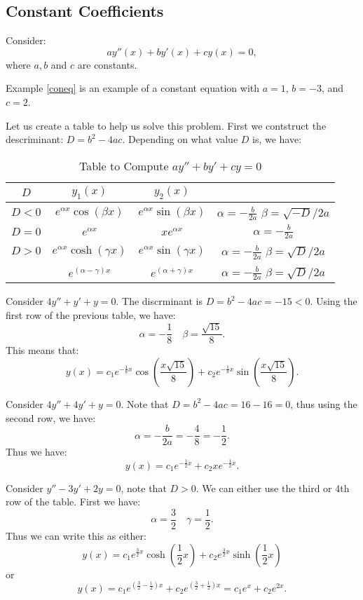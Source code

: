 \documentclass[../main/main.tex]{subfiles}
\begin{document}
\subsection{Constant Coefficients}
Consider: \[
	ay''(x)+by'(x)+cy(x)=0
,\] where $a,b$ and  $c$  are constants.
\begin{example}
	Example \ref{coneq} is an example of a constant equation with $a=1$, $b=-3$, and $c=2$.  
\end{example}
Let us create a table to help us solve this problem. First we contstruct the descriminant: $D=b^2-4ac$. Depending on what value $D$ is, we have: 
\begin{table}[htpb]
	\centering
	\caption{Table to Compute $ay''+by'+cy=0$}
	\label{tab:label}
	\begin{tabular}{c|c|c|c}
		$D$ &$y_1(x)$ & $y_2(x)$\\
	\hline
		$D<0$&  $e^{\alpha x}\cos(\beta x)$ & $e^{\alpha x}\sin(\beta x)$ &$\alpha=-\frac{b}{2a}$ $\beta=\sqrt{-D} /2a$\\
	\hline
		$D= 0$&  $e^{\alpha x}$ & $xe^{\alpha x}$ &$\alpha=-\frac{b}{2a}$	\\
	\hline
	$D> 0$&  $e^{\alpha x}\cosh(\gamma x)$ & $e^{\alpha x}\sin(\gamma x)$ &$\alpha=-\frac{b}{2a}$ $\beta=\sqrt{D} /2a$\\
	&  $e^{(\alpha-\gamma) x}$ & $e^{(\alpha+\gamma) x}$ &$\alpha=-\frac{b}{2a}$ $\beta=\sqrt{D} /2a$\\
	\end{tabular}
\end{table}

\begin{example}
	Consider $4y''+y'+y=0$. The discrminant is $D=b^2-4ac=-15<0$. Using the first row of the previous table, we have: \[
		\alpha = -\frac{1}{8}\quad \beta=\frac{\sqrt{15}}{8}
	.\] This means that: \[
	y(x) = c_1e^{-\frac{1}{8}x}\cos\left( \frac{x\sqrt{15} }{8} \right) +c_2e^{-\frac{1}{8}x}\sin\left( \frac{x\sqrt{15} }{8} \right) 
	.\] 
\end{example}
\begin{example}
	Consider $4y''+4y'+y=0$. Note that  $D=b^2-4ac=16-16=0$, thus using the second row, we have: \[
	\alpha=-\frac{b}{2a}=-\frac{4}{8}=-\frac{1}{2}
	.\] Thus we have: \[
	y(x) = c_1e^{-\frac{1}{2}x}+c_2xe^{-\frac{1}{2}x}
	.\] 
\end{example}
\begin{example}
	Consider $y''-3y'+2y=0$, note that  $D>0$. We can either use the third or 4th row of the table. First we have: \[
	\alpha= \frac{3}{2}\quad \gamma=\frac{1}{2}
	.\] Thus we can write this as either: \[
	y(x) = c_1 e^{\frac{3}{2}x}\cosh(\frac{1}{2}x)+c_2e^{\frac{3}{2}x}\sinh(\frac{1}{2}x)
	\] or \[
	y(x) = c_1e^{(\frac{3}{2}-\frac{1}{2})x}+c_2e^{(\frac{3}{2}+\frac{1}{2})x} = c_1e^{x}+c_2e^{2x}
	.\]  
\end{example}
\end{document}
